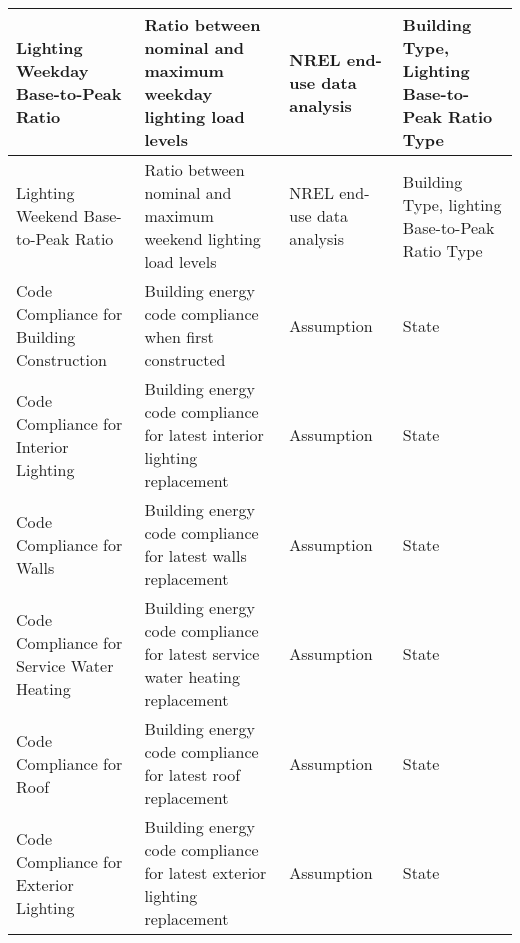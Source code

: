 \begin{center}
\begin{longtable}{|p{1.3in}|p{1.5in}|p{1.5in}|p{1.5in}|}
Lighting Weekday Base-to-Peak Ratio                             & Ratio between nominal and maximum weekday lighting load levels                 & NREL end-use data analysis                                  & Building Type, Lighting Base-to-Peak Ratio Type                                                      \\ \hline
Lighting Weekend Base-to-Peak Ratio                             & Ratio between nominal and maximum weekend lighting load levels                 & NREL end-use data analysis                                  & Building Type, lighting Base-to-Peak Ratio Type                                                      \\ \hline
Code Compliance for Building Construction                       & Building energy code compliance when first constructed                         & Assumption                                                  & State                                                                                                \\ \hline
Code Compliance for Interior Lighting                           & Building energy code compliance for latest interior lighting replacement       & Assumption                                                  & State                                                                                                \\ \hline
Code Compliance for Walls                                       & Building energy code compliance for latest walls replacement                   & Assumption                                                  & State                                                                                                \\ \hline
Code Compliance for Service Water Heating                       & Building energy code compliance for latest service water heating replacement   & Assumption                                                  & State                                                                                                \\ \hline
Code Compliance for Roof                                        & Building energy code compliance for latest roof replacement                    & Assumption                                                  & State                                                                                                \\ \hline
Code Compliance for Exterior Lighting                           & Building energy code compliance for latest exterior lighting replacement       & Assumption                                                  & State                                                                                                \\ \hline

\end{longtable}
\end{center}
